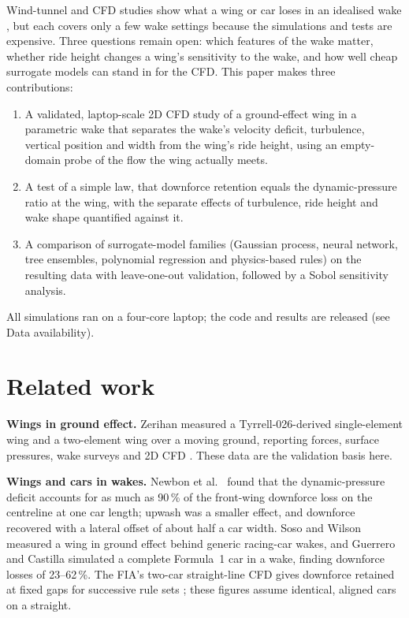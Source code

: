 \documentclass[11pt,a4paper]{article}
\begin{document}
Wind-tunnel and CFD studies show what a wing or car loses in an idealised wake \cite{newbon2017,soso2006,guerrero2020}, but each covers only a few wake settings because the simulations and tests are expensive. Three questions remain open: which features of the wake matter, whether ride height changes a wing's sensitivity to the wake, and how well cheap surrogate models can stand in for the CFD. This paper makes three contributions:
\begin{enumerate}
\item A validated, laptop-scale 2D CFD study of a ground-effect wing in a parametric wake that separates the wake's velocity deficit, turbulence, vertical position and width from the wing's ride height, using an empty-domain probe of the flow the wing actually meets.
\item A test of a simple law, that downforce retention equals the dynamic-pressure ratio at the wing, with the separate effects of turbulence, ride height and wake shape quantified against it.
\item A comparison of surrogate-model families (Gaussian process, neural network, tree ensembles, polynomial regression and physics-based rules) on the resulting data with leave-one-out validation, followed by a Sobol sensitivity analysis.
\end{enumerate}
All simulations ran on a four-core laptop; the code and results are released (see Data availability).

\section{Related work}
\textbf{Wings in ground effect.} Zerihan measured a Tyrrell-026-derived single-element wing and a two-element wing over a moving ground, reporting forces, surface pressures, wake surveys and 2D CFD \cite{zerihan2001,zerihan2000,zhang2003}. These data are the validation basis here.

\textbf{Wings and cars in wakes.} Newbon et al.\ \cite{newbon2017} found that the dynamic-pressure deficit accounts for as much as 90\,\% of the front-wing downforce loss on the centreline at one car length; upwash was a smaller effect, and downforce recovered with a lateral offset of about half a car width. Soso and Wilson \cite{soso2006} measured a wing in ground effect behind generic racing-car wakes, and Guerrero and Castilla \cite{guerrero2020} simulated a complete Formula~1 car in a wake, finding downforce losses of 23--62\,\%. The FIA's two-car straight-line CFD gives downforce retained at fixed gaps for successive rule sets \cite{f1_2021,race_2025}; these figures assume identical, aligned cars on a straight.
\end{document}
